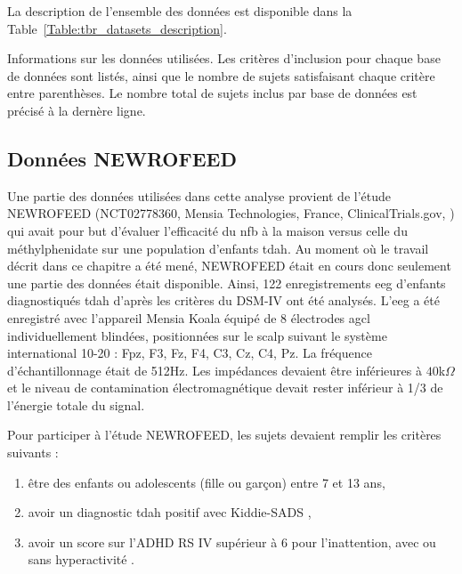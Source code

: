 La description de l'ensemble des données est disponible dans la Table~\ref{Table:tbr_datasets_description}.

\begin{table}[h!]
  \centering
  \caption{Informations sur les données utilisées. Les critères d'inclusion pour chaque base de données sont listés, ainsi que le nombre de sujets satisfaisant
	chaque critère entre parenthèses. Le nombre total de sujets inclus par base de données est précisé à la dernère ligne.}
  
  \label{Table:tbr_datasets_description}
\end{table}

\subsection{Données NEWROFEED}

Une partie des données utilisées dans cette analyse provient de l'étude NEWROFEED (NCT02778360, Mensia Technologies, France, ClinicalTrials.gov, \citet{Bioulac2019})
qui avait pour but d'évaluer l'efficacité du \gls{nfb} à la maison versus celle du méthylphenidate sur une population d'enfants \gls{tdah}.
Au moment où le travail décrit dans ce chapitre a été mené, NEWROFEED était en cours donc 
seulement une partie des données était disponible. Ainsi, 122 enregistrements \gls{eeg} d'enfants diagnostiqués \gls{tdah} d'après les critères du DSM-IV \citep{DSM-4} 
ont été analysés. L'\gls{eeg} a été enregistré avec l'appareil Mensia Koala équipé de 8 électrodes \gls{agcl} individuellement blindées, positionnées sur le scalp suivant
le système international 10-20 : Fpz, F3, Fz, F4, C3, Cz, C4, Pz. La fréquence d'échantillonnage était de 512Hz. Les impédances devaient être
inférieures à $40$k$\Omega$ et le niveau de contamination électromagnétique devait rester inférieur à 1/3 de l'énergie totale du signal. 

Pour participer à l'étude NEWROFEED, les sujets devaient remplir les critères suivants :
\begin{enumerate}
\item être des enfants ou adolescents (fille ou garçon) entre 7 et 13 ans,
\item avoir un diagnostic \gls{tdah} positif avec Kiddie-SADS \citep{Kaufman1997},
\item avoir un score sur l'ADHD RS IV supérieur à 6 pour l'inattention, avec ou sans hyperactivité \citep{Pappas2006}.
\end{enumerate}


